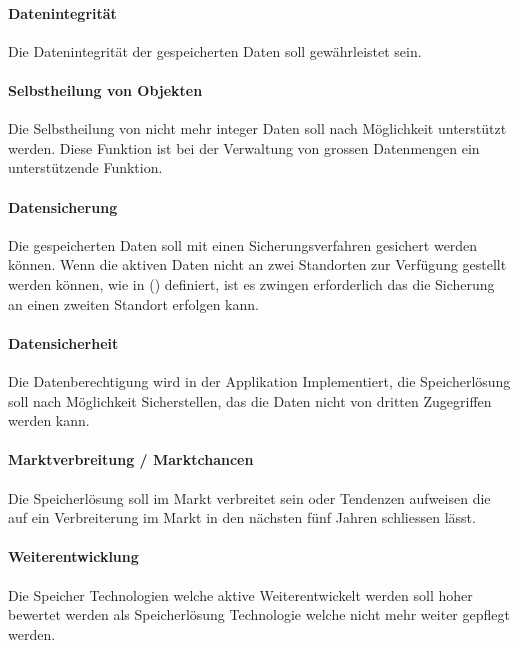 \setcounter{paragraph}{0}
\renewcommand\theparagraph{Soll-5-\arabic{paragraph}}

\paragraph{Datenintegrität}\label{Soll-5-1}
Die Datenintegrität der gespeicherten Daten soll gewährleistet sein.

\paragraph{Selbstheilung von Objekten}\label{Soll-5-2}
Die Selbstheilung von nicht mehr integer Daten soll nach Möglichkeit unterstützt werden. Diese Funktion ist bei der Verwaltung von grossen Datenmengen ein unterstützende Funktion.

\paragraph{Datensicherung}\label{Soll-5-3}
Die gespeicherten Daten soll mit einen Sicherungsverfahren gesichert werden können. Wenn die aktiven Daten nicht an zwei Standorten zur Verfügung gestellt werden können, wie in () definiert, ist es zwingen erforderlich das die Sicherung an einen zweiten Standort erfolgen kann.

\paragraph{Datensicherheit}\label{Soll-5-4}
Die Datenberechtigung wird in der Applikation Implementiert, die Speicherlösung soll nach Möglichkeit Sicherstellen, das die Daten nicht von dritten Zugegriffen werden kann.

\setcounter{paragraph}{0}
\renewcommand\theparagraph{Soll-6-\arabic{paragraph}}

\paragraph{Marktverbreitung / Marktchancen}\label{Soll-6-1}
Die Speicherlösung soll im Markt verbreitet sein oder Tendenzen aufweisen die auf ein Verbreiterung im Markt in den nächsten fünf Jahren schliessen lässt.

\paragraph{Weiterentwicklung}\label{Soll-6-2}
Die Speicher Technologien welche aktive Weiterentwickelt werden soll hoher bewertet werden als Speicherlösung Technologie welche nicht mehr weiter gepflegt werden.

